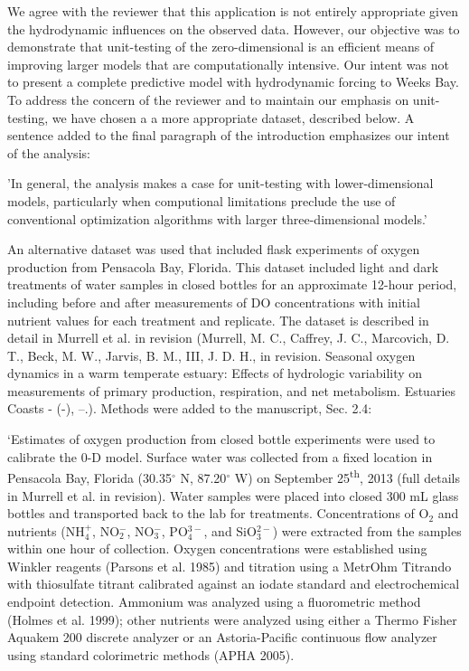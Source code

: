 \documentclass[letterpaper,12pt]{article}\usepackage[]{graphicx}\usepackage[]{color}
\begin{document}
{\it

We agree with the reviewer that this application is not entirely appropriate given the hydrodynamic influences on the observed data. However, our objective was to demonstrate that unit-testing of the zero-dimensional is an efficient means of improving larger models that are computationally intensive.  Our intent was not to present a complete predictive model with hydrodynamic forcing to Weeks Bay. To address the concern of the reviewer and to maintain our emphasis on unit-testing, we have chosen a a more appropriate dataset, described below.  A sentence added to the final paragraph of the introduction emphasizes our intent of the analysis:  

'In general, the analysis makes a case for unit-testing with lower-dimensional models, particularly when computional limitations preclude the use of conventional optimization algorithms with larger three-dimensional models.'

An alternative dataset was used that included flask experiments of oxygen production from Pensacola Bay, Florida.  This dataset included light and dark treatments of water samples in closed bottles for an approximate 12-hour period, including before and after measurements of DO concentrations with initial nutrient values for each treatment and replicate.  The dataset is described in detail in Murrell et al. in revision (Murrell, M. C., Caffrey, J. C., Marcovich, D. T., Beck, M. W., Jarvis, B. M., III, J. D. H., in revision. Seasonal oxygen dynamics in a warm temperate estuary: Effects of hydrologic variability on measurements of primary production, respiration, and net metabolism. Estuaries Coasts - (-), –.).  Methods were added to the manuscript, Sec. 2.4:

`Estimates of oxygen production from closed bottle experiments were used to calibrate the 0-D model.  Surface water was collected from a fixed location in Pensacola Bay, Florida (30.35$^{\circ}$ N, 87.20$^{\circ}$ W) on September 25\textsuperscript{th}, 2013 (full details in Murrell et al. in revision).  Water samples were placed into closed 300 mL glass bottles and transported back to the lab for treatments.  Concentrations of O$_2$ and nutrients (NH$_4^+$, NO$_2^-$, NO$_3^-$, PO$_4^{3-}$, and SiO$_3^{2-}$) were extracted from the samples within one hour of collection. Oxygen concentrations were established using Winkler reagents (Parsons et al. 1985) and titration using a MetrOhm Titrando with thiosulfate titrant calibrated against an iodate standard and electrochemical endpoint detection.  Ammonium was analyzed using a fluorometric method (Holmes et al. 1999); other nutrients were analyzed using either a Thermo Fisher Aquakem 200 discrete analyzer or an Astoria-Pacific continuous flow analyzer using standard colorimetric methods (APHA 2005).



}
\end{document}
